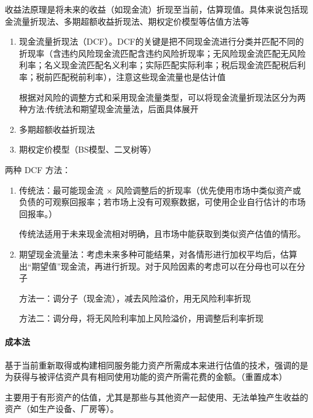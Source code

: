 \documentclass[UTF8,12pt]{ctexart}
\numberwithin{equation}{section} %
\numberwithin{figure}{section}
\numberwithin{table}{section}
\begin{document}
	收益法原理是将未来的收益（如现金流）折现至当前，估算现值。具体来说包括现金流量折现法、多期超额收益折现法、期权定价模型等估值方法等
	\begin{enumerate}
		\item 现金流量折现法（DCF）。DCF的关键是把不同现金流进行分类并匹配不同的折现率（含违约风险现金流匹配含违约风险折现率；无风险现金流匹配无风险利率；名义现金流匹配名义利率；实际匹配实际利率；税后现金流匹配税后利率；税前匹配税前利率），注意这些现金流量也是估计值
		
		根据对风险的调整方式和采用现金流量类型，可以将现金流量折现法区分为两种方法:传统法和期望现金流量法，后面具体展开
		
		\item 多期超额收益折现法
		
		\item 期权定价模型（BS模型、二叉树等）
	\end{enumerate}
		
	两种 DCF 方法：
	\begin{enumerate}
		\item 传统法：最可能现金流 $\times$ 风险调整后的折现率（优先使用市场中类似资产或负债的可观察回报率；若市场上没有可观察数据，可使用企业自行估计的市场回报率。）
		
		传统法适用于未来现金流相对明确，且市场中能获取到类似资产估值的情形。
		
		\item 期望现金流量法：考虑未来多种可能结果，对各情形进行加权平均后，估算出“期望值”现金流，再进行折现。对于风险因素的考虑可以在分母也可以在分子
		
		方法一：调分子（现金流），减去风险溢价，用无风险利率折现
		
		方法二：调分母，将无风险利率加上风险溢价，用调整后利率折现
	\end{enumerate}
	
	
	
	\paragraph{成本法}
	基于当前重新取得或构建相同服务能力资产所需成本来进行估值的技术，强调的是为获得与被评估资产具有相同使用功能的资产所需花费的金额。（重置成本）
	 
	主要用于有形资产的估值，尤其是那些与其他资产一起使用、无法单独产生收益的资产（如生产设备、厂房等）。
	
\end{document}
